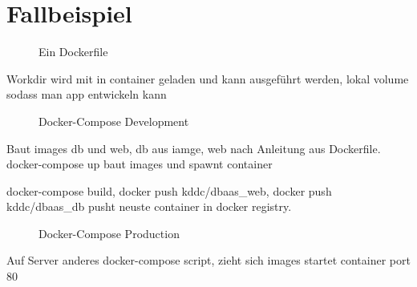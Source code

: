 \chapter{Fallbeispiel}

\begin{figure}[!ht]
  \centering
  \caption{Ein Dockerfile}\label{figure:Dockerfile}
\end{figure}

Workdir wird mit in container geladen und kann ausgeführt werden, lokal volume sodass man app entwickeln kann

\begin{figure}[!ht]
  \centering
  \caption{Docker-Compose Development}\label{figure:docker-compose development}
\end{figure}

Baut images db und web, db aus iamge, web nach Anleitung aus Dockerfile.
docker-compose up baut images und spawnt container

docker-compose build, docker push kddc/dbaas_web, docker push kddc/dbaas_db
pusht neuste container in docker registry.

\begin{figure}[!ht]
  \centering
  \caption{Docker-Compose Production}\label{figure:docker-compose production}
\end{figure}

Auf Server anderes docker-compose script, zieht sich images startet container port 80
